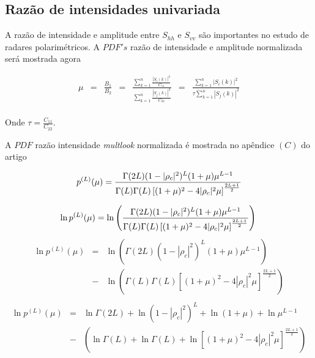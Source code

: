 \documentclass[journal,article,submit,moreauthors,pdftex]{Definitions/mdpi}
\begin{document}
\subsection{Razão de intensidades univariada}
A razão de intensidade e amplitude entre $S_{hh}$ e $S_{vv}$ são importantes no estudo de radares polarimétricos. A $PDF's$ razão de intensidade e amplitude normalizada será mostrada agora

\begin{equation}\label{eqn63}
\begin{array}{ccccccc}
	\mu&=&\frac{B_1}{B_2}&=&\frac{\sum_{k=1}^{n}\frac{|S_i(k)|^2}{C_{11}}}{\sum_{k=1}^{n}\frac{|S_j(k)|^2}{C_{22}}}&=&\frac{\sum_{k=1}^{n}|S_i(k)|^2}{\tau\sum_{k=1}^{n}|S_j(k)|^2}\\
\end{array}
\end{equation}

Onde $\tau=\frac{C_{11}}{C_{22}}$.

A $PDF$ razão intensidade {\it multlook} normalizada é mostrada no apêndice $(C)$ do artigo \cite{lee}  


\begin{equation}\label{eqn64}
	p^{(L)}(\mu)=\frac{\Gamma(2L)(1-|\rho_c|^2)^{L}(1+\mu)\mu^{L-1}}{\Gamma(L)\Gamma(L)\left[(1+\mu)^2-4|\rho_c|^2\mu \right]^{\frac{2L+1}{2}}}\\
\end{equation}

\begin{equation}\label{eqn64}
	\ln p^{(L)}(\mu)=\ln\left(\frac{\Gamma(2L)(1-|\rho_c|^2)^{L}(1+\mu)\mu^{L-1}}{\Gamma(L)\Gamma(L)\left[(1+\mu)^2-4|\rho_c|^2\mu \right]^{\frac{2L+1}{2}}}\right)\\
\end{equation}
\begin{equation}\label{eqn64}
\begin{array}{ccc}
	\ln p^{(L)}(\mu)&=&\ln\left(\Gamma(2L)(1-|\rho_c|^2)^{L}(1+\mu)\mu^{L-1}\right)\\
	&-&\ln\left(\Gamma(L)\Gamma(L)\left[(1+\mu)^2-4|\rho_c|^2\mu \right]^{\frac{2L+1}{2}}\right)\\
\end{array}
\end{equation}
\begin{equation}\label{eqn64}
\begin{array}{ccc}
	\ln p^{(L)}(\mu)&=&\ln\Gamma(2L) +\ln(1-|\rho_c|^2)^{L}+\ln(1+\mu)+\ln\mu^{L-1}\\
	&-&\left(\ln\Gamma(L)+\ln\Gamma(L)+\ln\left[(1+\mu)^2-4|\rho_c|^2\mu \right]^{\frac{2L+1}{2}}\right)\\
\end{array}
\end{equation}
\end{document}

